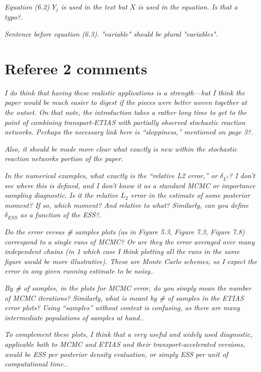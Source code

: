 \documentclass{article}
\newcommand{\comment}[2]{\vspace{0.6cm}{\bf Comment:} {\it #1.}

\vspace{0.3cm}{\bf Answer:} #2}
\begin{document}
\comment{Equation (6.2) $Y_j$ is used in the text but $X$ is used in the equation. Is that a typo?}{}

\comment{Sentence before equation (6.3). "variable" should be plural "variables"}{}

\section*{Referee 2 comments}

\comment{I do think that having these realistic applications is a strength—but I think the paper would be much easier to digest if the pieces were better woven together at the outset. On that note, the introduction takes a rather long time to get to the point of combining transport-ETIAS with partially observed stochastic reaction networks. Perhaps the necessary link here is “sloppiness,” mentioned on page 3?}{}

\comment{Also, it should be made more clear what exactly is new within the stochastic reaction networks portion of the paper}{}

\comment{In the numerical examples, what exactly is the “relative L2 error,” or $\delta_{L^2}$? I don’t see where this is defined, and I don’t know it as a standard MCMC or importance sampling diagnostic. Is it the relative $L_2$ error in the estimate of some posterior moment? If so, which moment? And relative to what? Similarly, can you define $\delta_{ESS}$ as a function of the ESS?}

\comment{Do the error versus \# samples plots (as in Figure 5.3, Figure 7.3, Figure 7.8) correspond to a single runs of MCMC? Or are they the error averaged over many independent chains (in
1
which case I think plotting all the runs in the same figure would be more illustrative). These are Monte Carlo schemes, so I expect the error in any given running estimate to be noisy.}{}

\comment{By \# of samples, in the plots for MCMC error, do you simply mean the number of MCMC iterations? Similarly, what is meant by \# of samples in the ETIAS error plots? Using “samples” without context is confusing, as there are many intermediate populations of samples at hand.}{}

\comment{To complement these plots, I think that a very useful and widely used diagnostic, applicable both to MCMC and ETIAS and their transport-accelerated versions, would be ESS per posterior density evaluation, or simply ESS per unit of computational time.}{}
\end{document}
